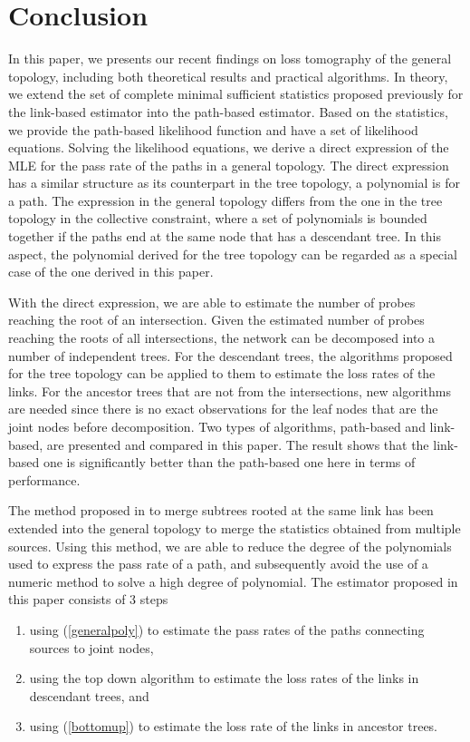 \documentclass[10pt,twocolumn]{IEEEtran}
\begin{document}
\section{Conclusion}
In this paper, we presents our recent findings on loss tomography of
the general topology, including both theoretical results and practical
algorithms. In theory, we extend the set of complete minimal
sufficient statistics proposed previously for the link-based estimator
into the path-based estimator. Based on the statistics, we provide the
path-based likelihood function and have a set of likelihood equations.
Solving the likelihood equations, we derive a direct expression of the
MLE for the pass rate of the paths in a general topology. The direct
expression has a similar structure as its counterpart in the tree
topology, a polynomial is for a path. The expression in the general
topology differs from the one in the tree topology in the collective
constraint, where a set of polynomials is bounded together if the
paths end at the same node that has a descendant tree.  In this
aspect, the polynomial derived for the tree topology \cite{CDHT99} can
be regarded as a special case of the one derived in this paper.

With the direct expression, we are able to estimate the number of
probes reaching the root of an intersection. Given the estimated
number of probes reaching the roots of all intersections, the network
can be decomposed into a number of independent trees. For the
descendant trees, the algorithms proposed for the tree topology can be
applied to them to estimate the loss rates of the links. For the
ancestor trees that are not from the intersections, new algorithms are
needed since there is no exact observations for the leaf nodes that
are the joint nodes before decomposition. Two types of algorithms,
path-based and link-based, are presented and compared in this paper.
The result shows that the link-based one is significantly better than
the path-based one here in terms of performance.

The method proposed in \cite{ZD09} to merge subtrees rooted at the
same link has been extended into the general topology to merge the
statistics obtained from multiple sources. Using this method, we are
able to reduce the degree of the polynomials used to express the pass
rate of a path, and subsequently avoid the use of a numeric method to
solve a high degree of polynomial. The estimator proposed in this
paper consists of 3 steps

\begin{enumerate}
\item using (\ref{generalpoly}) to estimate the pass rates of the paths connecting sources to joint nodes,
\item using the top down algorithm to estimate the loss rates of the links in descendant
trees, and
\item using (\ref{bottomup}) to estimate the loss rate of the links in
ancestor trees. \end{enumerate}
\end{document}
